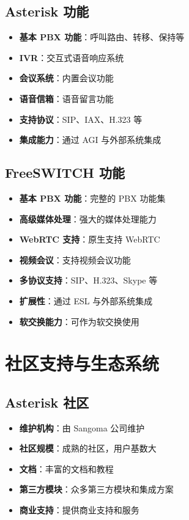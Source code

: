 \documentclass[12pt,UTF8]{ctexbook}
\begin{document}
\section{Asterisk 功能}

\begin{itemize}
  \item \textbf{基本 PBX 功能}：呼叫路由、转移、保持等
  \item \textbf{IVR}：交互式语音响应系统
  \item \textbf{会议系统}：内置会议功能
  \item \textbf{语音信箱}：语音留言功能
  \item \textbf{支持协议}：SIP、IAX、H.323 等
  \item \textbf{集成能力}：通过 AGI 与外部系统集成
\end{itemize}

\section{FreeSWITCH 功能}

\begin{itemize}
  \item \textbf{基本 PBX 功能}：完整的 PBX 功能集
  \item \textbf{高级媒体处理}：强大的媒体处理能力
  \item \textbf{WebRTC 支持}：原生支持 WebRTC
  \item \textbf{视频会议}：支持视频会议功能
  \item \textbf{多协议支持}：SIP、H.323、Skype 等
  \item \textbf{扩展性}：通过 ESL 与外部系统集成
  \item \textbf{软交换能力}：可作为软交换使用
\end{itemize}

\chapter{社区支持与生态系统}
\section{Asterisk 社区}

\begin{itemize}
  \item \textbf{维护机构}：由 Sangoma 公司维护
  \item \textbf{社区规模}：成熟的社区，用户基数大
  \item \textbf{文档}：丰富的文档和教程
  \item \textbf{第三方模块}：众多第三方模块和集成方案
  \item \textbf{商业支持}：提供商业支持和服务
\end{itemize}
\end{document}
